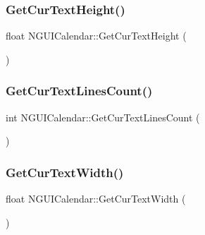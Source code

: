 \hypertarget{class_n_g_u_i_calendar_a53c12e0a021925c29825f47998bfedb9}{}\label{class_n_g_u_i_calendar_a53c12e0a021925c29825f47998bfedb9} 
\subsubsection{\texorpdfstring{Get\+Cur\+Text\+Height()}{GetCurTextHeight()}}
{\footnotesize\ttfamily float N\+G\+U\+I\+Calendar\+::\+Get\+Cur\+Text\+Height (\begin{DoxyParamCaption}{ }\end{DoxyParamCaption})}

\hypertarget{class_n_g_u_i_calendar_ad149a12c8425598c1c65562caf1ef61f}{}\label{class_n_g_u_i_calendar_ad149a12c8425598c1c65562caf1ef61f} 
\subsubsection{\texorpdfstring{Get\+Cur\+Text\+Lines\+Count()}{GetCurTextLinesCount()}}
{\footnotesize\ttfamily int N\+G\+U\+I\+Calendar\+::\+Get\+Cur\+Text\+Lines\+Count (\begin{DoxyParamCaption}{ }\end{DoxyParamCaption})}

\hypertarget{class_n_g_u_i_calendar_ac099efe37148658baa46975efe7d1161}{}\label{class_n_g_u_i_calendar_ac099efe37148658baa46975efe7d1161} 
\subsubsection{\texorpdfstring{Get\+Cur\+Text\+Width()}{GetCurTextWidth()}}
{\footnotesize\ttfamily float N\+G\+U\+I\+Calendar\+::\+Get\+Cur\+Text\+Width (\begin{DoxyParamCaption}{ }\end{DoxyParamCaption})}

\hypertarget{class_n_g_u_i_calendar_a90ec609120d5ca7f4ed533bd5d8dbeaa}{}\label{class_n_g_u_i_calendar_a90ec609120d5ca7f4ed533bd5d8dbeaa} 
